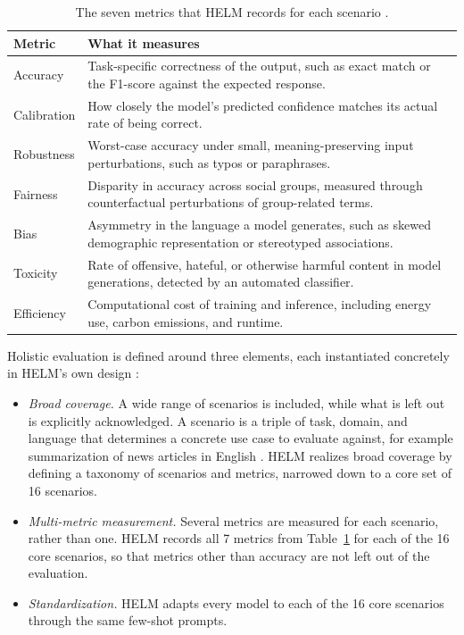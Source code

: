 \begin{table}[ht]
    \centering
    \renewcommand{\arraystretch}{1.2}
    \begin{tabularx}{0.85\textwidth}{@{}>{\raggedright\arraybackslash}p{2.2cm}X@{}}
        \toprule
        Metric & What it measures \\
        \midrule
        Accuracy & Task-specific correctness of the output, such as exact match or the F1-score against the expected response. \\
        Calibration & How closely the model's predicted confidence matches its actual rate of being correct. \\
        Robustness & Worst-case accuracy under small, meaning-preserving input perturbations, such as typos or paraphrases. \\
        Fairness & Disparity in accuracy across social groups, measured through counterfactual perturbations of group-related terms. \\
        Bias & Asymmetry in the language a model generates, such as skewed demographic representation or stereotyped associations. \\
        Toxicity & Rate of offensive, hateful, or otherwise harmful content in model generations, detected by an automated classifier. \\
        Efficiency & Computational cost of training and inference, including energy use, carbon emissions, and runtime. \\
        \bottomrule
    \end{tabularx}
    \caption[The seven metrics that HELM records for each scenario]{The seven metrics that HELM records for each scenario \cite{liangHolisticEvaluationLanguage2023}.}
    \label{tab:helm-metrics}
\end{table}

Holistic evaluation is defined around three elements, each instantiated concretely in HELM's own design \cite{liangHolisticEvaluationLanguage2023}:

\begin{itemize}
    \item \emph{Broad coverage.} A wide range of scenarios is included, while what is left out is explicitly acknowledged. A scenario is a triple of task, domain, and language that determines a concrete use case to evaluate against, for example summarization of news articles in English \cite{liangHolisticEvaluationLanguage2023}. HELM realizes broad coverage by defining a taxonomy of scenarios and metrics, narrowed down to a core set of 16 scenarios.
    \item \emph{Multi-metric measurement.} Several metrics are measured for each scenario, rather than one. HELM records all 7 metrics from Table~\ref{tab:helm-metrics} for each of the 16 core scenarios, so that metrics other than accuracy are not left out of the evaluation.
    \item \emph{Standardization.} HELM adapts every model to each of the 16 core scenarios through the same few-shot prompts.
\end{itemize}


